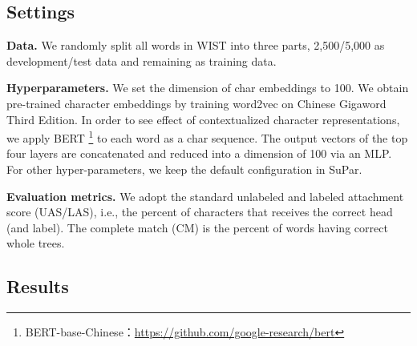 \subsection{Settings}

\textbf{Data.} We randomly split all words in WIST into three parts, 2,500/5,000 as development/test data and remaining as training data. 

\textbf{Hyperparameters.} 
We set the dimension of char embeddings to 100. 
We obtain pre-trained character embeddings by training  word2vec on Chinese Gigaword Third Edition.
In order to see effect of contextualized character representations, we apply BERT \cite{devlin-2019-bert} \footnote{BERT-base-Chinese：\url{https://github.com/google-research/bert}} to each word as a char sequence. The output vectors of the top four layers are concatenated and reduced into a dimension of 100 via an MLP. 
For other hyper-parameters, we keep the default configuration in SuPar.


\textbf{Evaluation metrics.} 
We adopt the standard unlabeled and labeled attachment score (UAS/LAS), i.e., the percent of characters that receives the correct head (and label). 
The complete match (CM) is the percent of words having correct whole trees.



\subsection{Results}

